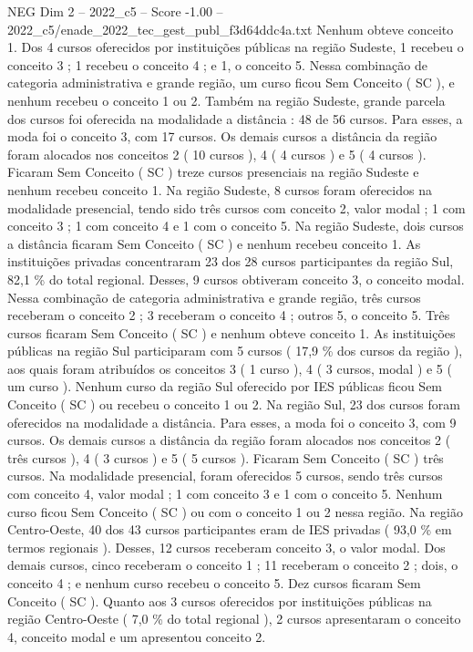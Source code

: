 \begin{textsample}{NEG Dim 2 – 2022\_c5 – Score -1.00 – 2022\_c5/enade\_2022\_tec\_gest\_publ\_f3d64ddc4a.txt}
Nenhum obteve conceito 1.
Dos 4 cursos oferecidos por instituições públicas na região Sudeste, 1 recebeu o conceito 3 ; 1 recebeu o conceito 4 ; e 1, o conceito 5.
Nessa combinação de categoria administrativa e grande região, um curso ficou Sem Conceito ( SC ), e nenhum recebeu o conceito 1 ou 2.
Também na região Sudeste, grande parcela dos cursos foi oferecida na modalidade a distância : 48 de 56 cursos.
Para esses, a moda foi o conceito 3, com 17 cursos.
Os demais cursos a distância da região foram alocados nos conceitos 2 ( 10 cursos ), 4 ( 4 cursos ) e 5 ( 4 cursos ).
Ficaram Sem Conceito ( SC ) treze cursos presenciais na região Sudeste e nenhum recebeu conceito 1.
Na região Sudeste, 8 cursos foram oferecidos na modalidade presencial, tendo sido três cursos com conceito 2, valor modal ; 1 com conceito 3 ; 1 com conceito 4 e 1 com o conceito 5.
Na região Sudeste, dois cursos a distância ficaram Sem Conceito ( SC ) e nenhum recebeu conceito 1.
As instituições privadas concentraram 23 dos 28 cursos participantes da região Sul, 82,1 \% do total regional.
Desses, 9 cursos obtiveram conceito 3, o conceito modal.
Nessa combinação de categoria administrativa e grande região, três cursos receberam o conceito 2 ; 3 receberam o conceito 4 ; outros 5, o conceito 5.
Três cursos ficaram Sem Conceito ( SC ) e nenhum obteve conceito 1.
As instituições públicas na região Sul participaram com 5 cursos ( 17,9 \% dos cursos da região ), aos quais foram atribuídos os conceitos 3 ( 1 curso ), 4 ( 3 cursos, modal ) e 5 ( um curso ).
Nenhum curso da região Sul oferecido por IES públicas ficou Sem Conceito ( SC ) ou recebeu o conceito 1 ou 2.
Na região Sul, 23 dos cursos foram oferecidos na modalidade a distância.
Para esses, a moda foi o conceito 3, com 9 cursos.
Os demais cursos a distância da região foram alocados nos conceitos 2 ( três cursos ), 4 ( 3 cursos ) e 5 ( 5 cursos ).
Ficaram Sem Conceito ( SC ) três cursos.
Na modalidade presencial, foram oferecidos 5 cursos, sendo três cursos com conceito 4, valor modal ; 1 com conceito 3 e 1 com o conceito 5.
Nenhum curso ficou Sem Conceito ( SC ) ou com o conceito 1 ou 2 nessa região.
Na região Centro-Oeste, 40 dos 43 cursos participantes eram de IES privadas ( 93,0 \% em termos regionais ).
Desses, 12 cursos receberam conceito 3, o valor modal.
Dos demais cursos, cinco receberam o conceito 1 ; 11 receberam o conceito 2 ; dois, o conceito 4 ; e nenhum curso recebeu o conceito 5.
Dez cursos ficaram Sem Conceito ( SC ).
Quanto aos 3 cursos oferecidos por instituições públicas na região Centro-Oeste ( 7,0 \% do total regional ), 2 cursos apresentaram o conceito 4, conceito modal e um apresentou conceito 2.

\end{textsample}

